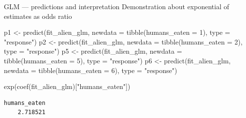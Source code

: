\documentclass[
  10pt,
  ignorenonframetext,
  aspectratio=169,
  t]{beamer}
\newenvironment{Shaded}{\begin{snugshade}}{\end{snugshade}}
\newcommand{\AttributeTok}[1]{\textcolor[rgb]{0.40,0.45,0.13}{#1}}
\newcommand{\DecValTok}[1]{\textcolor[rgb]{0.68,0.00,0.00}{#1}}
\newcommand{\FunctionTok}[1]{\textcolor[rgb]{0.28,0.35,0.67}{#1}}
\newcommand{\NormalTok}[1]{\textcolor[rgb]{0.00,0.23,0.31}{#1}}
\newcommand{\OtherTok}[1]{\textcolor[rgb]{0.00,0.23,0.31}{#1}}
\newcommand{\StringTok}[1]{\textcolor[rgb]{0.13,0.47,0.30}{#1}}
\begin{document}
\begin{frame}[fragile]{GLM --- predictions and interpretation}
\protect{}\label{glm-predictions-and-interpretation-5}
Demonstration about exponential of estimates as odds ratio

\footnotesize

\begin{Shaded}
\begin{Highlighting}[]
\NormalTok{p1 }\OtherTok{\textless{}{-}} \FunctionTok{predict}\NormalTok{(fit\_alien\_glm, }\AttributeTok{newdata =} \FunctionTok{tibble}\NormalTok{(}\AttributeTok{humans\_eaten =} \DecValTok{1}\NormalTok{), }\AttributeTok{type =} \StringTok{"response"}\NormalTok{)}
\NormalTok{p2 }\OtherTok{\textless{}{-}} \FunctionTok{predict}\NormalTok{(fit\_alien\_glm, }\AttributeTok{newdata =} \FunctionTok{tibble}\NormalTok{(}\AttributeTok{humans\_eaten =} \DecValTok{2}\NormalTok{), }\AttributeTok{type =} \StringTok{"response"}\NormalTok{)}
\NormalTok{p5 }\OtherTok{\textless{}{-}} \FunctionTok{predict}\NormalTok{(fit\_alien\_glm, }\AttributeTok{newdata =} \FunctionTok{tibble}\NormalTok{(}\AttributeTok{humans\_eaten =} \DecValTok{5}\NormalTok{), }\AttributeTok{type =} \StringTok{"response"}\NormalTok{)}
\NormalTok{p6 }\OtherTok{\textless{}{-}} \FunctionTok{predict}\NormalTok{(fit\_alien\_glm, }\AttributeTok{newdata =} \FunctionTok{tibble}\NormalTok{(}\AttributeTok{humans\_eaten =} \DecValTok{6}\NormalTok{), }\AttributeTok{type =} \StringTok{"response"}\NormalTok{)}

\FunctionTok{exp}\NormalTok{(}\FunctionTok{coef}\NormalTok{(fit\_alien\_glm)[}\StringTok{"humans\_eaten"}\NormalTok{])}
\end{Highlighting}
\end{Shaded}

\begin{verbatim}
humans_eaten 
    2.718521 
\end{verbatim}

\normalsize
\end{frame}
\end{document}

